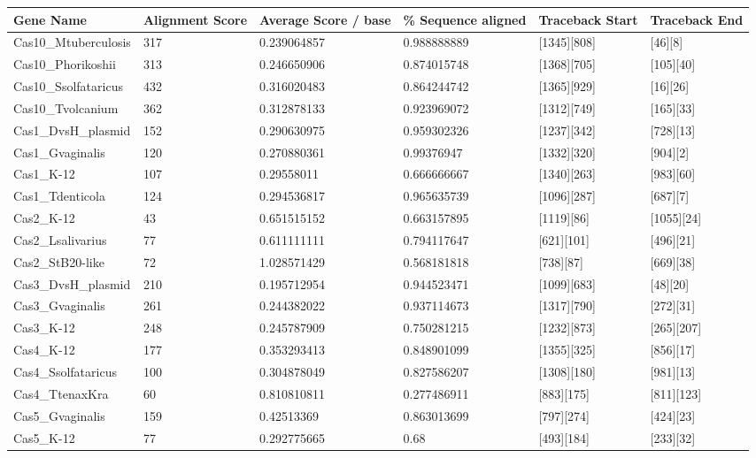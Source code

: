 \documentclass[11pt, oneside]{article}
\begin{document}
\begin{minipage}{\linewidth}
\smallskip
\centering
{} \label{locoutput} 
\begin{tabular}{ p{1.25in} C{.85in} *4{C{.75in}}}\toprule[1.5pt]
\bf Gene Name & \bf Alignment Score & \bf Average Score / base & \bf \% Sequence aligned & \bf Traceback Start & \bf Traceback End\\\midrule
Cas10\_Mtuberculosis & 317 & 0.239064857 & 0.988888889 & [1345][808] & [46][8]\\ 
Cas10\_Phorikoshii & 313 & 0.246650906 & 0.874015748 & [1368][705] & [105][40]\\ 
Cas10\_Ssolfataricus & 432 & 0.316020483 & 0.864244742 & [1365][929] & [16][26]\\ 
Cas10\_Tvolcanium & 362 & 0.312878133 & 0.923969072 & [1312][749] & [165][33]\\ 
Cas1\_DvsH\_plasmid & 152 & 0.290630975 & 0.959302326 & [1237][342] & [728][13]\\ 
Cas1\_Gvaginalis & 120 & 0.270880361 & 0.99376947 & [1332][320] & [904][2]\\ 
Cas1\_K-12 & 107 & 0.29558011 & 0.666666667 & [1340][263] & [983][60]\\ 
Cas1\_Tdenticola & 124 & 0.294536817 & 0.965635739 & [1096][287] & [687][7]\\ 
Cas2\_K-12 & 43 & 0.651515152 & 0.663157895 & [1119][86] & [1055][24]\\ 
Cas2\_Lsalivarius & 77 & 0.611111111 & 0.794117647 & [621][101] & [496][21]\\ 
Cas2\_StB20-like & 72 & 1.028571429 & 0.568181818 & [738][87] & [669][38]\\ 
Cas3\_DvsH\_plasmid & 210 & 0.195712954 & 0.944523471 & [1099][683] & [48][20]\\ 
Cas3\_Gvaginalis & 261 & 0.244382022 & 0.937114673 & [1317][790] & [272][31]\\ 
Cas3\_K-12 & 248 & 0.245787909 & 0.750281215 & [1232][873] & [265][207]\\ 
Cas4\_K-12 & 177 & 0.353293413 & 0.848901099 & [1355][325] & [856][17]\\ 
Cas4\_Ssolfataricus & 100 & 0.304878049 & 0.827586207 & [1308][180] & [981][13]\\ 
Cas4\_TtenaxKra & 60 & 0.810810811 & 0.277486911 & [883][175] & [811][123]\\ 
Cas5\_Gvaginalis & 159 & 0.42513369 & 0.863013699 & [797][274] & [424][23]\\ 
Cas5\_K-12 & 77 & 0.292775665 & 0.68 & [493][184] & [233][32]\\ 

\end{tabular}
\end{minipage}
\end{document}
